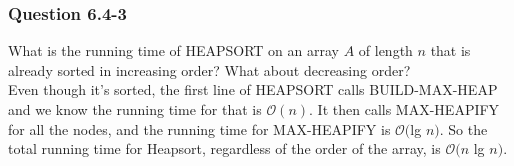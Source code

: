 \documentclass[11pt]{article}
\begin{document}
\vspace{20pt}

\subsubsection*{Question 6.4-3}\nointerlineskip
What is the running time of HEAPSORT on an array $A$ of length $n$ that is already sorted in increasing order? What about decreasing order?\\

Even though it's sorted, the first line of HEAPSORT calls BUILD-MAX-HEAP and we know the running time for that is $\mathcal{O}(n)$. It then calls MAX-HEAPIFY for all the nodes, and the running time for MAX-HEAPIFY is $\mathcal{O}($lg $n)$. So the total running time for Heapsort, regardless of the order of the array, is $\mathcal{O}(n$ lg $n)$. \\
\end{document}
